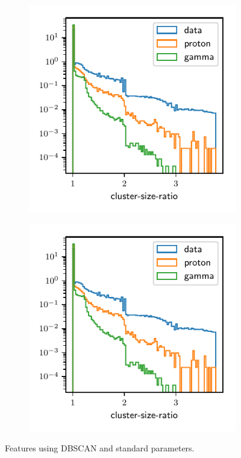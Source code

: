 \begin{figure}
\begin{subfigure}{0.5\textwidth}
  \end{subfigure}
  \begin{subfigure}{0.5\textwidth}
    \centering
    \includegraphics[width=\textwidth, page=15]{Plots/data_mc/features_DBSCAN.pdf}
  \end{subfigure}
  \begin{subfigure}{0.5\textwidth}
    \centering
    \includegraphics[width=\textwidth, page=9]{Plots/data_mc/features_DBSCAN.pdf}
  \end{subfigure}
  \caption{Features using DBSCAN and standard parameters.}
  \label{fig:feat_dbscan}
\end{figure}

